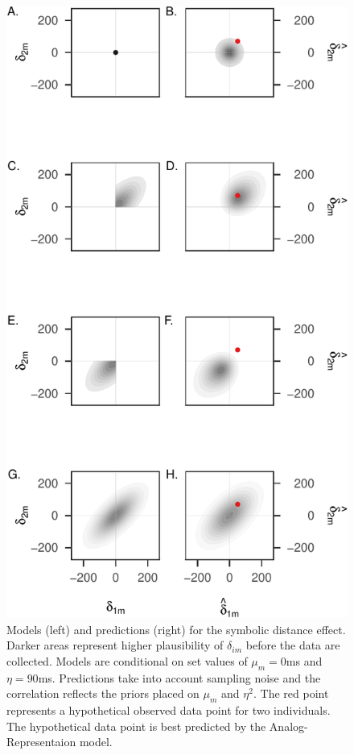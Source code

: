 \documentclass[english,,man]{apa6}
\begin{document}
\begin{figure}
\centering
\includegraphics{p_files/figure-latex/modelplot-1.pdf}
\caption{\label{fig:modelplot}Models (left) and predictions (right) for the symbolic distance effect. Darker areas represent higher plausibility of \(\delta_{im}\) before the data are collected. Models are conditional on set values of \(\mu_m=0\)ms and \(\eta=90\)ms. Predictions take into account sampling noise and the correlation reflects the priors placed on \(\mu_m\) and \(\eta^2\). The red point represents a hypothetical observed data point for two individuals. The hypothetical data point is best predicted by the Analog-Representaion model.}
\end{figure}
\end{document}

